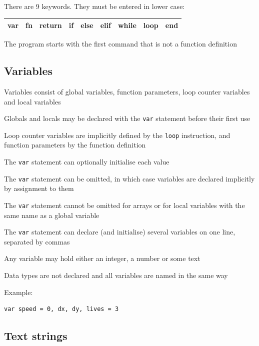 \documentclass[12pt,a4paper,twoside]{article}
\renewcommand{\_}{\texttt{\symbol{95}}}
\begin{document}
There are 9 keywords. They must be entered in lower case:

{\bfseries \ttfamily
\begin{tabular}{|lllllllll|}
\hline
var & fn & return & if & else & elif & while & loop & end\\
\hline
\end{tabular}
}

The program starts with the first command that is not a function
definition

\subsection{Variables}

\begin{bulletlist}
\item Variables consist of global variables, function parameters,
	loop counter variables and local variables
\item Globals and locals may be declared with the \verb^var^
   statement before their first use
\item Loop counter variables are implicitly defined by the \verb^loop^
	instruction, and function parameters by the function definition
\item The \verb^var^ statement can optionally initialise each value
\item The \verb^var^ statement can be omitted, in which case variables
   are declared implicitly by assignment to them
\item The \verb^var^ statement cannot be omitted for arrays or for local
	variables with the same name as a global variable
\item The \verb^var^ statement can declare (and initialise) several
	variables on one line, separated by commas
\item Any variable may hold either an integer, a number or some text
\item Data types are not declared and all variables are named in the same way
\end{bulletlist}

Example:
\begin{verbatim}
var speed = 0, dx, dy, lives = 3
\end{verbatim}

\subsection{Text strings}
\end{document}

